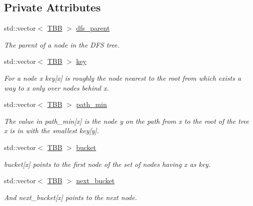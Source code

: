\subsection*{Private Attributes}
\begin{DoxyCompactItemize}
\item 
std\+::vector$<$ \hyperlink{Dominance_8hpp_ac35ffd4ddeccae8225d6ec6f55d65a97}{T\+BB} $>$ \hyperlink{classdom__info_ac70e44625882df4c67ae0066e9122679}{dfs\+\_\+parent}
\begin{DoxyCompactList}\small\item\em The parent of a node in the D\+FS tree. \end{DoxyCompactList}\item 
std\+::vector$<$ \hyperlink{Dominance_8hpp_ac35ffd4ddeccae8225d6ec6f55d65a97}{T\+BB} $>$ \hyperlink{classdom__info_ab9a443369069fb66f7eb8c4f7f258614}{key}
\begin{DoxyCompactList}\small\item\em For a node x key\mbox{[}x\mbox{]} is roughly the node nearest to the root from which exists a way to x only over nodes behind x. \end{DoxyCompactList}\item 
std\+::vector$<$ \hyperlink{Dominance_8hpp_ac35ffd4ddeccae8225d6ec6f55d65a97}{T\+BB} $>$ \hyperlink{classdom__info_a5ebfc0d7c9b3a71e3e085cd4f042ea29}{path\+\_\+min}
\begin{DoxyCompactList}\small\item\em The value in path\+\_\+min\mbox{[}x\mbox{]} is the node y on the path from x to the root of the tree x is in with the smallest key\mbox{[}y\mbox{]}. \end{DoxyCompactList}\item 
std\+::vector$<$ \hyperlink{Dominance_8hpp_ac35ffd4ddeccae8225d6ec6f55d65a97}{T\+BB} $>$ \hyperlink{classdom__info_ac12a7da04724cb23285b00eda2751aaf}{bucket}
\begin{DoxyCompactList}\small\item\em bucket\mbox{[}x\mbox{]} points to the first node of the set of nodes having x as key. \end{DoxyCompactList}\item 
std\+::vector$<$ \hyperlink{Dominance_8hpp_ac35ffd4ddeccae8225d6ec6f55d65a97}{T\+BB} $>$ \hyperlink{classdom__info_a20c12ddab8c9f2b2ba0f7427d1afa667}{next\+\_\+bucket}
\begin{DoxyCompactList}\small\item\em And next\+\_\+bucket\mbox{[}x\mbox{]} points to the next node. \end{DoxyCompactList}\item 

\end{DoxyCompactItemize}
